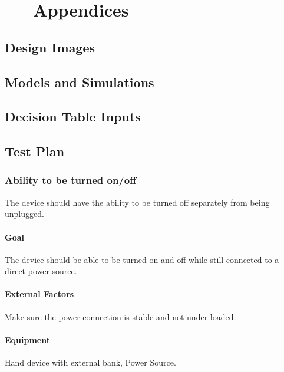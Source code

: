 \documentclass{article}
\begin{document}
\section{\bf{-----Appendices-----}}
\subsection{Design Images} 


\subsection{Models and Simulations}

\subsection{Decision Table Inputs}

\subsection{Test Plan}
\subsubsection{Ability to be turned on/off}
The device should have the ability to be turned off separately from being unplugged.

\paragraph{Goal} The device should be able to be turned on and off while still connected to a direct power source.

\paragraph{External Factors} Make sure the power connection is stable and not under loaded.

\paragraph{Equipment} Hand device with external bank, Power Source.
\end{document}
